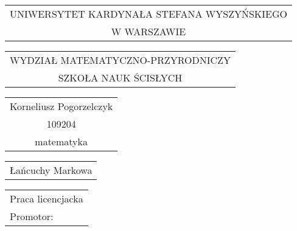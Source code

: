 \documentclass[final,a4paper,openany,12pt]{mwbk}
\begin{document}
\newtheorem{Tw}{Twierdzenie}
\newtheorem{Def}{Definicja}
\newtheorem{Prz}{Przykład}
\newtheorem{Dow}{Dowód}
\newtheorem{Ozn}{Oznaczenie}
\selectfont %

\begin{titlepage}
\vspace{-0.5cm}

\renewcommand{\arraystretch}{1.3} %

\begin{center}
{\footnotesize
\begin{tabular}{c}
UNIWERSYTET KARDYNAŁA STEFANA WYSZYŃSKIEGO\\
W WARSZAWIE\\
\end{tabular}
}
\vspace{2.5cm}

{\footnotesize
\begin{tabular}{c}
WYDZIAŁ MATEMATYCZNO-PRZYRODNICZY\\
SZKOŁA NAUK ŚCISŁYCH\\
\end{tabular}
}
\vspace{2.7cm}

\renewcommand{\arraystretch}{1.5} %

{\normalsize
\begin{tabular}{c}
Korneliusz Pogorzelczyk\\

109204\\

matematyka\\
\end{tabular}
}

\vspace{2.3cm}

{\large
\begin{tabular}{c}
Łańcuchy Markowa
\end{tabular}
}

\end{center}
\vspace{4cm}

\hspace{6cm}
\begin{tabular}{l}
Praca licencjacka\\

Promotor:\\


\end{tabular}
\end{titlepage}
\end{document}
